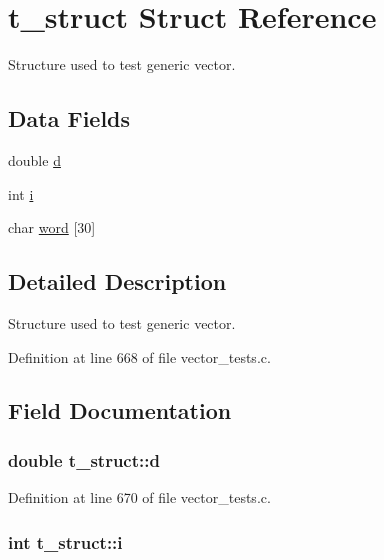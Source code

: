 \hypertarget{structt__struct}{\section{t\-\_\-struct Struct Reference}
\label{structt__struct}
}


Structure used to test generic vector.  


\subsection*{Data Fields}
\begin{DoxyCompactItemize}
\item 
double \hyperlink{structt__struct_a2029e2f2da88d23bcc9fa6ba45f51bf4}{d}
\item 
int \hyperlink{structt__struct_a488184c86cae0be164cfb634882b8f7a}{i}
\item 
char \hyperlink{structt__struct_ab5b290b572fc4036f1e5efc671098c7f}{word} \mbox{[}30\mbox{]}
\end{DoxyCompactItemize}


\subsection{Detailed Description}
Structure used to test generic vector. 



Definition at line 668 of file vector\-\_\-tests.\-c.



\subsection{Field Documentation}
\hypertarget{structt__struct_a2029e2f2da88d23bcc9fa6ba45f51bf4}{
\subsubsection[{d}]{\setlength{\rightskip}{0pt plus 5cm}double t\-\_\-struct\-::d}}\label{structt__struct_a2029e2f2da88d23bcc9fa6ba45f51bf4}


Definition at line 670 of file vector\-\_\-tests.\-c.

\hypertarget{structt__struct_a488184c86cae0be164cfb634882b8f7a}{
\subsubsection[{i}]{\setlength{\rightskip}{0pt plus 5cm}int t\-\_\-struct\-::i}}\label{structt__struct_a488184c86cae0be164cfb634882b8f7a}


